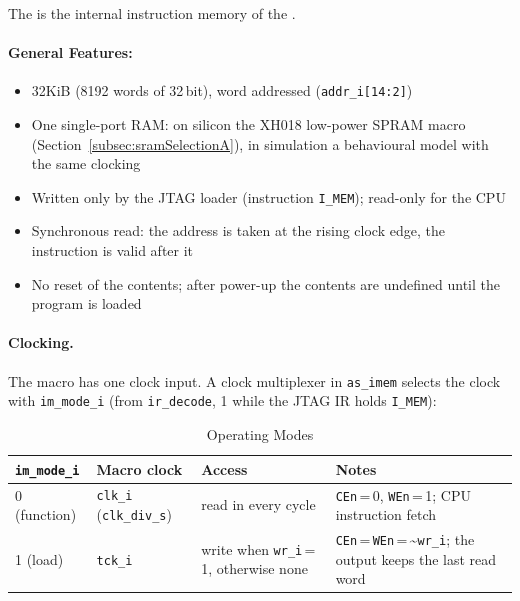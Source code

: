 The \asimemg is the internal instruction memory of the \aschip.

\paragraph{General Features: }
\begin{itemize}
  \item 32\;KiB (8192 words of 32\,bit), word addressed (\texttt{addr\_i[14:2]})
  \item One single-port RAM: on silicon the XH018 low-power SPRAM macro
    (Section~\ref{subsec:sramSelectionA}), in simulation a behavioural
    model with the same clocking
  \item Written only by the JTAG loader (instruction \texttt{I\_MEM});
    read-only for the CPU
  \item Synchronous read: the address is taken at the rising clock edge,
    the instruction is valid after it
  \item No reset of the contents; after power-up the contents are undefined
    until the program is loaded
\end{itemize}

\paragraph{Clocking.}
The macro has one clock input. A clock multiplexer in \texttt{as\_imem}
selects the clock with \texttt{im\_mode\_i} (from \texttt{ir\_decode},
1 while the JTAG IR holds \texttt{I\_MEM}):

\begin{table}[H]
\caption{\asimemg Operating Modes}
\label{tab:asImemModes}
\centering
\begin{tabularx}{\textwidth}{|l |l |l |X|}
  \hline
  \texttt{im\_mode\_i} & Macro clock & Access & Notes \\
  \hline
  \hline
  0 (function) & \texttt{clk\_i} (\texttt{clk\_div\_s}) & read in every cycle &
    \texttt{CEn}\,=\,0, \texttt{WEn}\,=\,1; CPU instruction fetch \\
  \hline
  1 (load) & \texttt{tck\_i} & write when \texttt{wr\_i}\,=\,1, otherwise none &
    \texttt{CEn}\,=\,\texttt{WEn}\,=\,\textasciitilde\texttt{wr\_i};
    the output keeps the last read word \\
  \hline
\end{tabularx}
\end{table}

